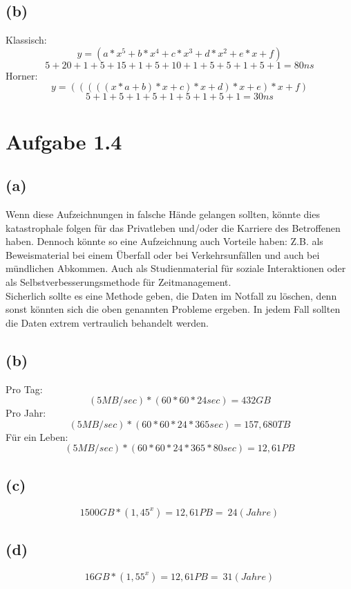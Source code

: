 \documentclass[12pt]{article}
\begin{document}
\subsection{(b)}
Klassisch:
\[y = ( a * x^5 + b * x^4 + c * x^3 + d * x^2 + e * x + f )\]
\[5 + 20 + 1 + 5 + 15 + 1 + 5 + 10 + 1 + 5 + 5 + 1 + 5 + 1  = 80 ns\]
Horner:
\[y = ((((( x * a + b ) * x + c ) * x + d ) * x + e ) * x + f ) \]
\[5 + 1 + 5 + 1 + 5 + 1 + 5 + 1 + 5 + 1 = 30ns\]

\newpage
\section{Aufgabe 1.4}
\subsection{(a)}
Wenn diese Aufzeichnungen in falsche Hände gelangen sollten, könnte dies
katastrophale folgen für das Privatleben und/oder die Karriere des Betroffenen
haben. Dennoch könnte so eine Aufzeichnung auch Vorteile haben: Z.B. als
Beweismaterial bei einem Überfall oder bei Verkehrsunfällen und auch bei
mündlichen Abkommen.
Auch als Studienmaterial für soziale Interaktionen oder als
Selbstverbesserungsmethode für Zeitmanagement.
\\
Sicherlich sollte es eine Methode geben, die Daten im Notfall zu löschen, denn
sonst könnten sich die oben genannten Probleme ergeben. In jedem Fall sollten
die Daten extrem vertraulich behandelt werden.

\subsection{(b)}
Pro Tag:
    \[(5 MB / sec) * (60 * 60 * 24 sec) = 432 GB\]
Pro Jahr:
    \[(5 MB / sec) * (60 * 60 * 24 * 365 sec) = 157,680 TB\]
Für ein Leben:
    \[(5 MB / sec) * (60 * 60 * 24 * 365 * 80 sec) = 12,61 PB\]

\subsection{(c)}
    \[1500 GB * (1,45^x) = 12,61 PB =~ 24 (Jahre)\]

\subsection{(d)}
    \[16 GB * (1,55^x) = 12,61 PB =~ 31 (Jahre)\]
\end{document}
